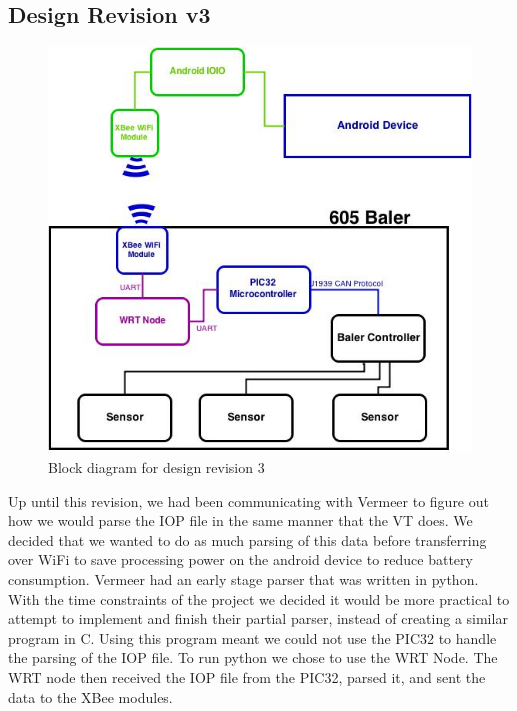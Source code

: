 \documentclass[paper=a4, fontsize=11pt]{scrartcl}
\numberwithin{equation}{section}		%
\numberwithin{figure}{section}			%
\numberwithin{table}{section}				%
\begin{document}
\subsection{Design Revision v3} 
 \begin{figure}[ht]
	 \center\includegraphics[scale=0.5]{rev3.jpg}
 \caption{Block diagram for design revision 3}
 \end{figure}
Up until this revision, we had been communicating with Vermeer to figure out how we would parse the IOP file in the same manner that the VT does. We decided that we wanted to do as much parsing of this data before transferring over WiFi to save processing power on the android device to reduce battery consumption. Vermeer had an early stage parser that was written in python. With the time constraints of the project we decided it would be more practical to attempt to implement and finish their partial parser, instead of creating a similar program in C. Using this program meant we could not use the PIC32 to handle the parsing of the IOP file. To run python we chose to use the WRT Node. The WRT node then received the IOP file from the PIC32, parsed it, and sent the data to the XBee modules. \\
\end{document}
